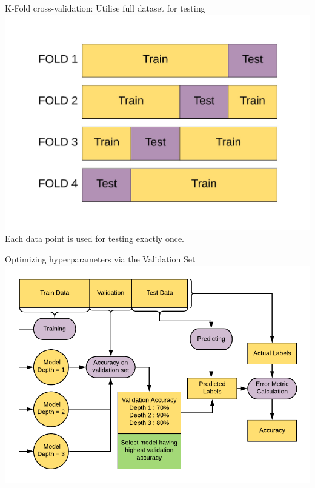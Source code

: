 \documentclass[usenames,dvipsnames]{beamer}
\begin{document}
\begin{frame}{K-Fold cross-validation: Utilise full dataset for testing}
\includegraphics[width = \textwidth]{../assets/cross-validation/diagrams/cross-validation-train-test}
\pause Each data point is used for testing exactly once.
\end{frame}

\begin{frame}{Optimizing hyperparameters via the Validation Set}
\includegraphics[width = \textwidth]{../assets/cross-validation/diagrams/validation-workflow}
\end{frame}
\end{document}
